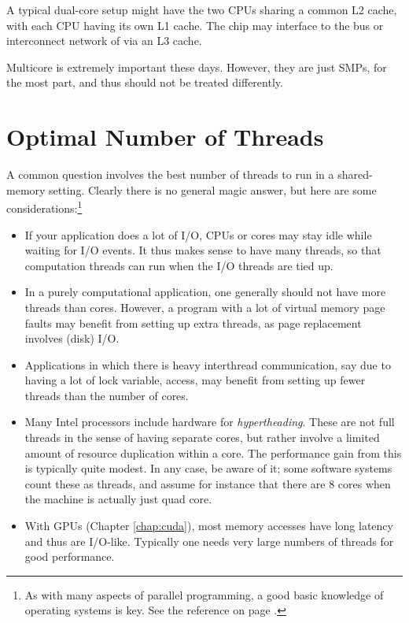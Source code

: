 A typical dual-core setup might have the two CPUs sharing a common L2
cache, with each CPU having its own L1 cache.  The chip may interface to
the bus or interconnect network of via an L3 cache.

Multicore is extremely important these days.  However, they are just
SMPs, for the most part, and thus should not be treated differently.

\section{Optimal Number of Threads}

A common question involves the best number of threads to run in a
shared-memory setting.  Clearly there is no general magic answer, but
here are some considerations:\footnote{As with many aspects of parallel
programming, a good basic knowledge of operating systems is key.  See
the reference on page \pageref{needknowos}.}

\begin{itemize}

\item If your application does a lot of I/O, CPUs or cores may stay idle
while waiting for I/O events.  It thus makes sense to have many threads,
so that computation threads can run when the I/O threads are tied up.

\item In a purely computational application, one generally should not
have more threads than cores.  However, a program with a lot of virtual
memory page faults may benefit from setting up extra threads, as page
replacement involves (disk) I/O.

\item Applications in which there is heavy interthread communication,
say due to having a lot of lock variable, access, may benefit from
setting up fewer threads than the number of cores.

\item Many Intel processors include hardware for {\it hypertheading}.
These are not full threads in the sense of having separate cores, but
rather involve a limited amount of resource duplication within a core.
The performance gain from this is typically quite modest.  In any case,
be aware of it; some software systems count these as threads, and assume
for instance that there are 8 cores when the machine is actually just
quad core.

\item With GPUs (Chapter \ref{chap:cuda}), most memory accesses have
long latency and thus are I/O-like.  Typically one needs very large
numbers of threads for good performance.

\end{itemize}

